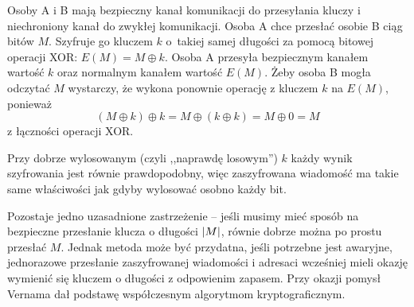 Osoby A i B mają bezpieczny kanał komunikacji do przesyłania kluczy i niechroniony kanał do zwykłej komunikacji. Osoba A chce przesłać osobie B ciąg bitów \( M \).
Szyfruje go kluczem \( k \) o~takiej samej długości za pomocą bitowej operacji XOR: \( E(M) = M \oplus k \).
Osoba A przesyła bezpiecznym kanałem wartość \( k \) oraz normalnym kanałem wartość \( E(M) \). Żeby osoba B mogła odczytać \( M \) wystarczy, że wykona ponownie operację z kluczem \( k \) na \( E(M) \), ponieważ
\[
    (M \oplus k) \oplus k = M \oplus (k \oplus k)  = M \oplus 0 = M
\]
z łączności operacji XOR.

Przy dobrze wylosowanym (czyli ,,naprawdę losowym'') \( k \) każdy wynik szyfrowania jest równie prawdopodobny, więc zaszyfrowana wiadomość ma takie same właściwości jak gdyby wylosować osobno każdy bit.

Pozostaje jedno uzasadnione zastrzeżenie -- jeśli musimy mieć sposób na bezpieczne przesłanie klucza o długości \( \left\lvert M\right\rvert \), równie dobrze można po prostu przesłać \( M \).
Jednak metoda może być przydatna, jeśli potrzebne jest awaryjne, jednorazowe przesłanie zaszyfrowanej wiadomości i adresaci wcześniej mieli okazję wymienić się kluczem o długości z odpowienim zapasem. Przy okazji pomysł Vernama dał podstawę współczesnym algorytmom kryptograficznym.